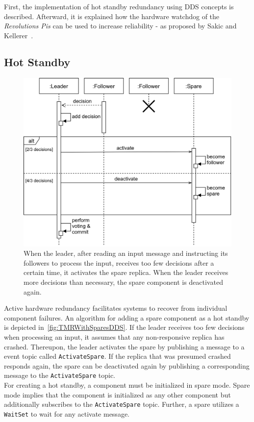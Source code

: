 First, the implementation of hot standby redundancy using DDS concepts is described.
Afterward, it is explained how the hardware watchdog of the \textit{Revolutions Pis} can be used to increase reliability - as proposed by Sakic and Kellerer~\cite{SakicTimeInConsensus}.

\subsection{Hot Standby}
\label{sec:HotStandby}

\begin{figure}[!ht]
	\centering
	\includegraphics[width=0.75\linewidth]{images/sequence/ActivateSpare}
	\caption{When the leader, after reading an input message and instructing its followers to process the input, receives too few decisions after a certain time, it activates the spare replica. When the leader receives more decisions than necessary, the spare component is deactivated again.}
	\label{fig:SeqActivateSpare}
\end{figure}

Active hardware redundancy facilitates systems to recover from individual component failures.
An algorithm for adding a spare component as a hot standby is depicted in~\autoref{fig:TMRWithSparesDDS}.
If the leader receives too few decisions when processing an input, it assumes that any non-responsive replica has crashed.
Thereupon, the leader activates the spare by publishing a message to a  event topic called \texttt{ActivateSpare}.
If the replica that was presumed crashed responds again, the spare can be deactivated again by publishing a corresponding message to the \texttt{ActivateSpare} topic.
\\

For creating a hot standby, a component must be initialized in spare mode.
Spare mode implies that the component is initialized as any other component but additionally subscribes to the \texttt{ActivateSpare} topic.
Further, a spare utilizes a \texttt{WaitSet} to wait for any activate message.
\\

